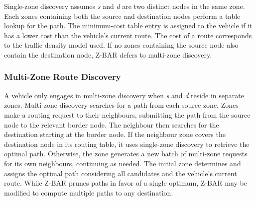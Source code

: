 \documentclass[conference]{IEEEtran}
\begin{document}
Single-zone discovery assumes \textit{s} and \textit{d} are two distinct nodes in the same zone. Each zones containing both the source and destination nodes perform a table lookup for the path. The minimum-cost table entry is assigned to the vehicle if it has a lower cost than the vehicle's current route. The cost of a route corresponds to the traffic density model used. If no zones containing the source node also contain the destination node, Z-BAR defers to multi-zone discovery.

\subsubsection{Multi-Zone Route Discovery}

A vehicle only engages in multi-zone discovery when \textit{s} and \textit{d} reside in separate zones. Multi-zone discovery searches for a path from each source zone. Zones make a routing request to their neighbours, submitting the path from the source node to the relevant border node. The neighbour then searches for the destination starting at the border node. If the neighbour zone covers the destination node in its routing table, it uses single-zone discovery to retrieve the optimal path. Otherwise, the zone generates a new batch of multi-zone requests for its own neighbours, continuing as needed. The initial zone determines and assigns the optimal path considering all candidates and the vehicle's current route. While Z-BAR prunes paths in favor of a single optimum, Z-BAR may be modified to compute multiple paths to any destination.


\end{document}
